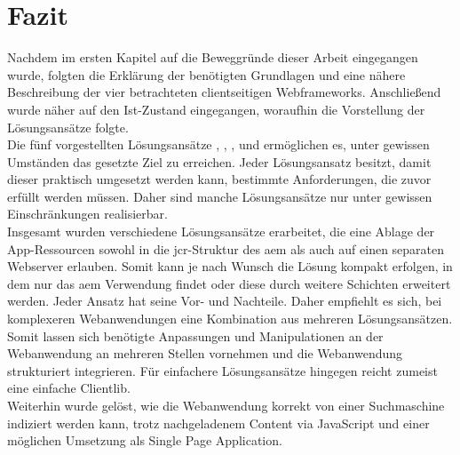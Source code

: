 \section{Fazit}

Nachdem im ersten Kapitel auf die Beweggründe dieser Arbeit eingegangen wurde, folgten die Erklärung der benötigten Grundlagen und eine nähere Beschreibung der vier betrachteten clientseitigen Webframeworks. Anschließend wurde näher auf den Ist-Zustand eingegangen, woraufhin die Vorstellung der Lösungsansätze folgte. \\
Die fünf vorgestellten Lösungsansätze , , ,  und  ermöglichen es, unter gewissen Umständen das gesetzte Ziel zu erreichen. Jeder Lösungsansatz besitzt, damit dieser praktisch umgesetzt werden kann, bestimmte Anforderungen, die zuvor erfüllt werden müssen. Daher sind manche Lösungsansätze nur unter gewissen Einschränkungen realisierbar. \\
Insgesamt wurden verschiedene Lösungsansätze erarbeitet, die eine Ablage der App-Ressourcen sowohl in die \ac{jcr}-Struktur des \ac{aem} als auch auf einen separaten Webserver erlauben. Somit kann je nach Wunsch die Lösung kompakt erfolgen, in dem nur das \ac{aem} Verwendung findet oder diese durch weitere Schichten erweitert werden. Jeder Ansatz hat seine Vor- und Nachteile. Daher empfiehlt es sich, bei komplexeren Webanwendungen eine Kombination aus mehreren Lösungsansätzen. Somit lassen sich benötigte Anpassungen und Manipulationen an der Webanwendung an mehreren Stellen vornehmen und die Webanwendung strukturiert integrieren. Für einfachere Lösungsansätze hingegen reicht zumeist eine einfache Clientlib. \\
Weiterhin wurde gelöst, wie die Webanwendung korrekt von einer Suchmaschine indiziert werden kann, trotz nachgeladenem Content via JavaScript und einer möglichen Umsetzung als Single Page Application.